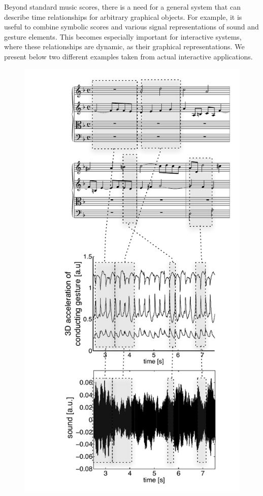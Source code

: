\documentclass[letterpaper, 12pt]{article}
\begin{document}
Beyond standard music scores, there is a need for a general system that can describe time relationships for arbitrary graphical objects. For example, it is useful to combine symbolic scores and various signal representations of sound and gesture elements. 
This becomes especially important for interactive systems, where these relationships are dynamic, as their graphical representations. We present below two different examples taken from actual interactive applications.

\begin{figure} %
\begin{center}
	\includegraphics[width=\baseimgwidth]{imgs/fig-gesture-sound-segments}

\end{center}
\end{figure}
\end{document}
